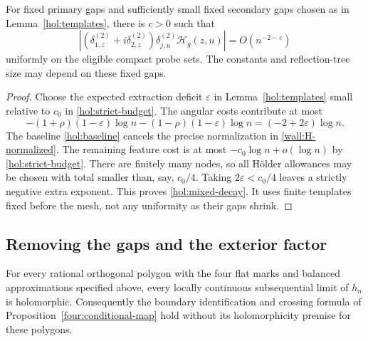 \begin{proposition}
\label{hol:mixed-bound}
For fixed primary gaps and sufficiently small fixed secondary gaps
chosen as in Lemma~\ref{hol:templates}, there is $c>0$ such that
\begin{equation}
 \left| (\delta_{1,z}^{(2)}+i\delta_{2,z}^{(2)})
               \delta_{j,u}^{(2)}\mathcal H_g(z,u)\right|
       =O(n^{-2-c})
 \label{hol:mixed-decay}
\end{equation}
uniformly on the eligible compact probe sets.  The constants and
reflection-tree size may depend on these fixed gaps.
\end{proposition}

\begin{proof}
Choose the expected extraction deficit $\varepsilon$ in
Lemma~\ref{hol:templates} small relative to $c_0$ in
\eqref{hol:strict-budget}.  The angular costs contribute at most
\begin{equation}
 -(1+\rho)(1-\varepsilon)\log n
 -(1-\rho)(1-\varepsilon)\log n
       =(-2+2\varepsilon)\log n.
 \label{hol:extracted-cost}
\end{equation}
The baseline \eqref{hol:baseline} cancels the precise normalization
in \eqref{wall:H-normalized}.  The remaining feature cost is at most
$-c_0\log n+o(\log n)$ by \eqref{hol:strict-budget}.
There are finitely many nodes, so all H\"older allowances may be chosen
with total smaller than, say, $c_0/4$.  Taking
$2\varepsilon<c_0/4$ leaves a strictly negative extra exponent.
This proves \eqref{hol:mixed-decay}.  It uses finite templates fixed
before the mesh, not any uniformity as their gaps shrink.
\end{proof}

\subsection{Removing the gaps and the exterior factor}

\begin{theorem}
\label{hol:disk}
For every rational orthogonal polygon with the four flat marks and
balanced approximations specified above, every locally continuous
subsequential limit of $h_n$ is holomorphic.  Consequently the boundary
identification and crossing formula of
Proposition~\ref{four:conditional-map} hold without its holomorphicity
premise for these polygons.
\end{theorem}

